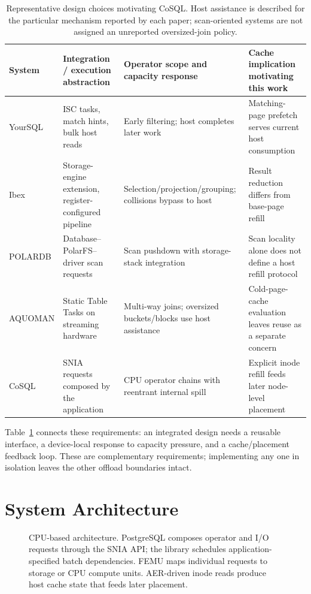 \documentclass[sigconf, nonacm]{acmart}
\begin{document}
\begin{table}[t]
\caption{Representative design choices motivating CoSQL. Host assistance is
described for the particular mechanism reported by each paper; scan-oriented
systems are not assigned an unreported oversized-join policy.}
\label{tab:priorchoices}
\small
\begin{tabular}{@{}p{}p{}p{}p{}@{}}
\toprule
System & Integration / execution abstraction & Operator scope and capacity response & Cache implication motivating this work \\
\midrule
YourSQL & ISC tasks, match hints, bulk host reads & Early filtering; host completes later work & Matching-page prefetch serves current host consumption \\
Ibex & Storage-engine extension, register-configured pipeline & Selection/projection/grouping; collisions bypass to host & Result reduction differs from base-page refill \\
POLARDB & Database--PolarFS--driver scan requests & Scan pushdown with storage-stack integration & Scan locality alone does not define a host refill protocol \\
AQUOMAN & Static Table Tasks on streaming hardware & Multi-way joins; oversized buckets/blocks use host assistance & Cold-page-cache evaluation leaves reuse as a separate concern \\
CoSQL & SNIA requests composed by the application & CPU operator chains with reentrant internal spill & Explicit inode refill feeds later node-level placement \\
\bottomrule
\end{tabular}
\end{table}

Table~\ref{tab:priorchoices} connects these requirements: an integrated design
needs a reusable interface, a device-local response to capacity pressure,
and a cache/placement feedback loop. These are complementary requirements;
implementing any one in isolation leaves the other offload boundaries intact.

\section{System Architecture}
\label{sec:architecture}
\begin{figure}[t]
\centering
\resizebox{\textwidth}{!}{}
\caption{CPU-based architecture. PostgreSQL composes operator and I/O requests
through the SNIA API; the library schedules application-specified batch
dependencies. FEMU maps individual requests to storage or CPU compute units.
AER-driven inode reads produce host cache state that feeds later placement.}
\label{fig:architecture}
\end{figure}
\end{document}
